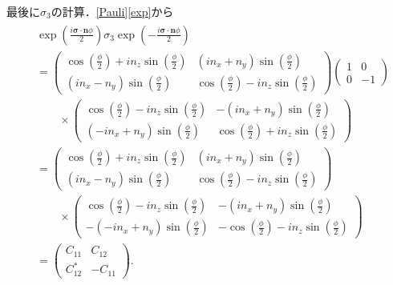 \documentclass[a4paper]{ltjsreport}
\begin{document}
最後に$\sigma_3$の計算．\eqref{Pauli}\eqref{exp}から
\begin{align}
  \begin{split}
    & \exp\left(\frac{i\boldsymbol{\sigma}\cdot\boldsymbol{n}\phi}{2}\right)\sigma_3\exp\left(-\frac{i\boldsymbol{\sigma}\cdot\boldsymbol{n}\phi}{2}\right)\\
    & =
    \begin{pmatrix}
      \cos\left(\frac{\phi}{2}\right)+in_z\sin\left(\frac{\phi}{2}\right) & (in_x+n_y)\sin\left(\frac{\phi}{2}\right) \\
      (in_x-n_y)\sin\left(\frac{\phi}{2}\right) & \cos\left(\frac{\phi}{2}\right)-in_z\sin\left(\frac{\phi}{2}\right)
    \end{pmatrix}
    \begin{pmatrix}
      1 & 0 \\
      0 & -1
    \end{pmatrix}
    \\
    & \qquad\times
    \begin{pmatrix}
      \cos\left(\frac{\phi}{2}\right)-in_z\sin\left(\frac{\phi}{2}\right) & -(in_x+n_y)\sin\left(\frac{\phi}{2}\right) \\
      (-in_x+n_y)\sin\left(\frac{\phi}{2}\right) & \cos\left(\frac{\phi}{2}\right)+in_z\sin\left(\frac{\phi}{2}\right)
    \end{pmatrix}
    \\
    & =
    \begin{pmatrix}
      \cos\left(\frac{\phi}{2}\right)+in_z\sin\left(\frac{\phi}{2}\right) & (in_x+n_y)\sin\left(\frac{\phi}{2}\right) \\
      (in_x-n_y)\sin\left(\frac{\phi}{2}\right) & \cos\left(\frac{\phi}{2}\right)-in_z\sin\left(\frac{\phi}{2}\right)
    \end{pmatrix}
    \\
    & \qquad\times
    \begin{pmatrix}
      \cos\left(\frac{\phi}{2}\right)-in_z\sin\left(\frac{\phi}{2}\right) & -(in_x+n_y)\sin\left(\frac{\phi}{2}\right) \\
      -(-in_x+n_y)\sin\left(\frac{\phi}{2}\right) & -\cos\left(\frac{\phi}{2}\right)-in_z\sin\left(\frac{\phi}{2}\right)
    \end{pmatrix}
    \\
    & =
    \begin{pmatrix}
      C_{11} & C_{12}\\
      C_{12}^* & -C_{11}
    \end{pmatrix}
    .
  \end{split}
  \label{comp_3}
\end{align}
\end{document}
